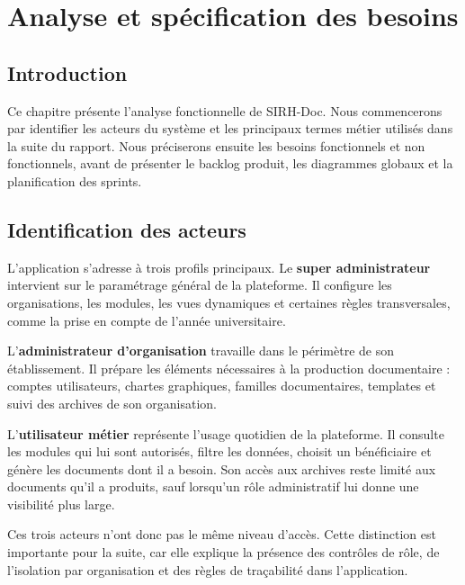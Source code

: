 
\chapter{Analyse et spécification des besoins}

\section{Introduction}

Ce chapitre présente l'analyse fonctionnelle de SIRH-Doc. Nous commencerons par identifier les acteurs du système et les principaux termes métier utilisés dans la suite du rapport. Nous préciserons ensuite les besoins fonctionnels et non fonctionnels, avant de présenter le backlog produit, les diagrammes globaux et la planification des sprints.

\section{Identification des acteurs}

L'application s'adresse à trois profils principaux. Le \textbf{super administrateur} intervient sur le paramétrage général de la plateforme. Il configure les organisations, les modules, les vues dynamiques et certaines règles transversales, comme la prise en compte de l'année universitaire.

L'\textbf{administrateur d'organisation} travaille dans le périmètre de son établissement. Il prépare les éléments nécessaires à la production documentaire : comptes utilisateurs, chartes graphiques, familles documentaires, templates et suivi des archives de son organisation.

L'\textbf{utilisateur métier} représente l'usage quotidien de la plateforme. Il consulte les modules qui lui sont autorisés, filtre les données, choisit un bénéficiaire et génère les documents dont il a besoin. Son accès aux archives reste limité aux documents qu'il a produits, sauf lorsqu'un rôle administratif lui donne une visibilité plus large.

Ces trois acteurs n'ont donc pas le même niveau d'accès. Cette distinction est importante pour la suite, car elle explique la présence des contrôles de rôle, de l'isolation par organisation et des règles de traçabilité dans l'application.

